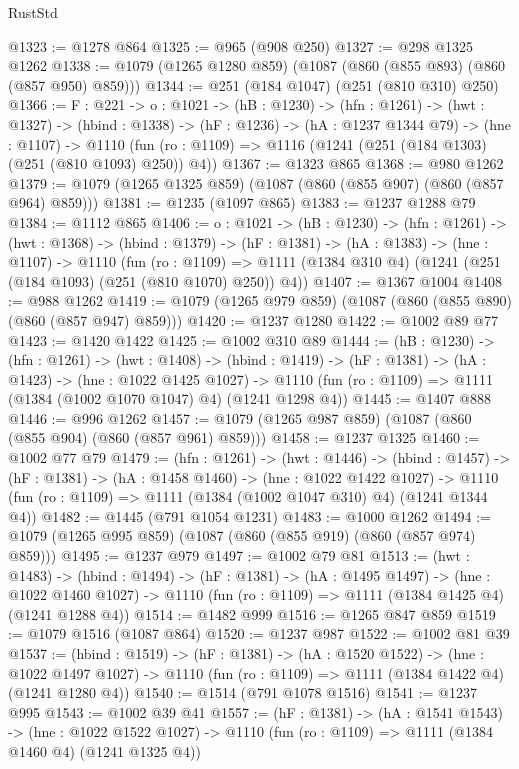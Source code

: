 \begin{lexlean}{RustStd}
\begin{coremodule}
{\begin{coremodule}
{@1323 := @1278 @864
@1325 := @965 (@908 @250)
@1327 := @298 @1325 @1262
@1338 := @1079 (@1265 @1280 @859) (@1087 (@860 (@855 @893) (@860 (@857 @950) @859)))
@1344 := @251 (@184 @1047) (@251 (@810 @310) @250)
@1366 := {F : @221} ->
  {o : @1021} ->
  (hB : @1230) ->
  (hfn : @1261) ->
  (hwt : @1327) ->
  (hbind : @1338) ->
  (hF : @1236) ->
  (hA : @1237 @1344 @79) ->
  (hne : @1107) ->
  @1110 (fun (ro : @1109) => @1116 (@1241 (@251 (@184 @1303) (@251 (@810 @1093) @250)) @4))
@1367 := @1323 @865
@1368 := @980 @1262
@1379 := @1079 (@1265 @1325 @859) (@1087 (@860 (@855 @907) (@860 (@857 @964) @859)))
@1381 := @1235 (@1097 @865)
@1383 := @1237 @1288 @79
@1384 := @1112 @865
@1406 := {o : @1021} ->
  (hB : @1230) ->
  (hfn : @1261) ->
  (hwt : @1368) ->
  (hbind : @1379) ->
  (hF : @1381) ->
  (hA : @1383) ->
  (hne : @1107) ->
  @1110
    (fun (ro : @1109) =>
    @1111 (@1384 @310 @4) (@1241 (@251 (@184 @1093) (@251 (@810 @1070) @250)) @4))
@1407 := @1367 @1004
@1408 := @988 @1262
@1419 := @1079 (@1265 @979 @859) (@1087 (@860 (@855 @890) (@860 (@857 @947) @859)))
@1420 := @1237 @1280
@1422 := @1002 @89 @77
@1423 := @1420 @1422
@1425 := @1002 @310 @89
@1444 := (hB : @1230) ->
  (hfn : @1261) ->
  (hwt : @1408) ->
  (hbind : @1419) ->
  (hF : @1381) ->
  (hA : @1423) ->
  (hne : @1022 @1425 @1027) ->
  @1110 (fun (ro : @1109) => @1111 (@1384 (@1002 @1070 @1047) @4) (@1241 @1298 @4))
@1445 := @1407 @888
@1446 := @996 @1262
@1457 := @1079 (@1265 @987 @859) (@1087 (@860 (@855 @904) (@860 (@857 @961) @859)))
@1458 := @1237 @1325
@1460 := @1002 @77 @79
@1479 := (hfn : @1261) ->
  (hwt : @1446) ->
  (hbind : @1457) ->
  (hF : @1381) ->
  (hA : @1458 @1460) ->
  (hne : @1022 @1422 @1027) ->
  @1110 (fun (ro : @1109) => @1111 (@1384 (@1002 @1047 @310) @4) (@1241 @1344 @4))
@1482 := @1445 (@791 @1054 @1231)
@1483 := @1000 @1262
@1494 := @1079 (@1265 @995 @859) (@1087 (@860 (@855 @919) (@860 (@857 @974) @859)))
@1495 := @1237 @979
@1497 := @1002 @79 @81
@1513 := (hwt : @1483) ->
  (hbind : @1494) ->
  (hF : @1381) ->
  (hA : @1495 @1497) ->
  (hne : @1022 @1460 @1027) -> @1110 (fun (ro : @1109) => @1111 (@1384 @1425 @4) (@1241 @1288 @4))
@1514 := @1482 @999
@1516 := @1265 @847 @859
@1519 := @1079 @1516 (@1087 @864)
@1520 := @1237 @987
@1522 := @1002 @81 @39
@1537 := (hbind : @1519) ->
  (hF : @1381) ->
  (hA : @1520 @1522) ->
  (hne : @1022 @1497 @1027) -> @1110 (fun (ro : @1109) => @1111 (@1384 @1422 @4) (@1241 @1280 @4))
@1540 := @1514 (@791 @1078 @1516)
@1541 := @1237 @995
@1543 := @1002 @39 @41
@1557 := (hF : @1381) ->
  (hA : @1541 @1543) ->
  (hne : @1022 @1522 @1027) -> @1110 (fun (ro : @1109) => @1111 (@1384 @1460 @4) (@1241 @1325 @4))
}
\end{coremodule}}
\end{coremodule}
\end{lexlean}

